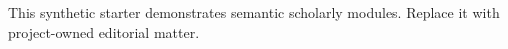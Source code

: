 \documentclass[10pt,twoside,openany]{book}
\begin{document}
\PSEBeginFrontMatter
\PSETitlePage
\PSEPublicationPage
{}
This synthetic starter demonstrates semantic scholarly modules. Replace it with project-owned editorial matter.
\tableofcontents
\clearpage
\PSEBeginBody

\PSEBeginBackMatter
{}

\PSEPrintBibliography
\PSEPrintIndex
\end{document}

